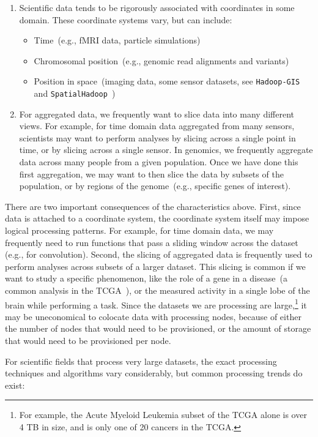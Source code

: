 \documentclass{sig-alternate}
\begin{document}
\begin{enumerate}
\item Scientific data tends to be rigorously associated with coordinates in some domain. These coordinate
systems vary, but can include:
\begin{itemize}
\item Time~(e.g., fMRI data, particle simulations)
\item Chromosomal position~(e.g., genomic read alignments and variants)
\item Position in space~(imaging data, some \linebreak sensor datasets, see \texttt{Hadoop-GIS}~\cite{aji13} and
\texttt{SpatialHadoop}~\cite{eldawy15})
\end{itemize}
\item For aggregated data, we frequently want to slice data into many different views. For example, for time
domain data aggregated from many sensors, scientists may want to perform analyses by slicing
across a single point in time, or by slicing across a single sensor. In genomics, we frequently aggregate data
across many people from a given population. Once we have done this first aggregation, we may want to then
slice the data by subsets of the population, or by regions of the genome~(e.g., specific genes of interest).
\end{enumerate}

There are two important consequences of the characteristics above. First, since data is attached to a
coordinate system, the coordinate system itself may impose logical processing patterns. For example, for
time domain data, we may frequently need to run functions that pass a sliding window across the dataset (e.g., for
convolution). Second, the slicing of aggregated data is frequently used to perform analyses across
subsets of a larger dataset. This slicing is common if we want to study a specific phenomenon, like the role of a
gene in a disease~(a common analysis in the TCGA~\cite{weinstein13}), or the measured activity in a
single lobe of the brain while performing a task. Since the datasets we are processing are
large,\footnote{For example, the Acute Myeloid Leukemia subset of the TCGA alone is over 4 TB in size, and
is only one of 20 cancers in the TCGA.} it may be uneconomical to colocate data with processing nodes,
because of either the number of nodes that would need to be provisioned, or the amount of storage that would
need to be provisioned per node.

For scientific fields that process very large datasets, the exact processing techniques and algorithms vary
considerably, but common processing trends do exist:
\end{document}
